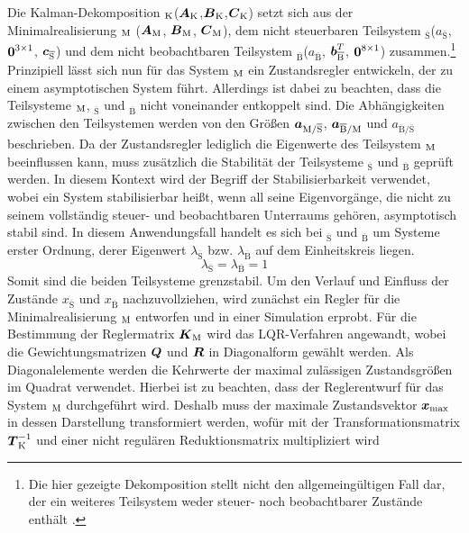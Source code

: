 Die Kalman-Dekomposition $_{\text{K}}$($\boldsymbol{A}_{\text{K}}$,$\boldsymbol{B}_{\text{K}}$,$\boldsymbol{C}_{\text{K}}$) setzt sich aus der Minimalrealisierung $_{\text{M}}$ ($\boldsymbol{A}_{\text{M}}$, $\boldsymbol{B}_{\text{M}}$, $\boldsymbol{C}_{\text{M}}$), dem nicht steuerbaren Teilsystem $_{\overline{\text{S}}}$($a_{\overline{\text{S}}}$, $\boldsymbol{0}^{3\times 1}$, $\boldsymbol{c}_{\overline{\text{S}}}$) und dem nicht beobachtbaren Teilsystem $_{\overline{\text{B}}}$($a_{\overline{\text{B}}}$, $\boldsymbol{b}^T_{\overline{\text{B}}}$, $\boldsymbol{0}^{8\times 1}$) zusammen.\footnote{Die hier gezeigte Dekomposition stellt nicht den allgemeingültigen Fall dar, der ein weiteres Teilsystem weder steuer- noch beobachtbarer Zustände enthält \cite[S. 108 ff.]{LunzeRT2}.} Prinzipiell lässt sich nun für das System $_{\text{M}}$ ein Zustandsregler entwickeln, der zu einem asymptotischen System führt. Allerdings ist dabei zu beachten, dass die Teilsysteme $_{\text{M}}$, $_{\overline{\text{S}}}$ und $_{\overline{\text{B}}}$ nicht voneinander entkoppelt sind. Die Abhängigkeiten zwischen den Teilsystemen werden von den Größen $\boldsymbol{a}_{\text{M}/\overline{\text{S}}}$, $\boldsymbol{a}_{\overline{\text{B}}/\text{M}}$ und $a_{\overline{\text{B}}/\overline{\text{S}}}$ beschrieben. Da der Zustandsregler lediglich die Eigenwerte des Teilsystem $_{\text{M}}$ beeinflussen kann, muss zusätzlich die Stabilität der Teilsysteme $_{\overline{\text{S}}}$ und $_{\overline{\text{B}}}$ geprüft werden. In diesem Kontext wird der Begriff der Stabilisierbarkeit verwendet, wobei ein System stabilisierbar heißt, wenn all seine Eigenvorgänge, die nicht zu seinem vollständig steuer- und beobachtbaren Unterraums gehören, asymptotisch stabil sind. In diesem Anwendungsfall handelt es sich bei $_{\overline{\text{S}}}$ und $_{\overline{\text{B}}}$ um Systeme erster Ordnung, derer Eigenwert $\lambda_{\overline{\text{S}}}$ bzw. $\lambda_{\overline{\text{B}}}$ auf dem Einheitskreis liegen.
\begin{equation}
\lambda_{\overline{\text{S}}} = \lambda_{\overline{\text{B}}} = 1
\end{equation}
Somit sind die beiden Teilsysteme grenzstabil. Um den Verlauf und Einfluss der Zustände $x_{\overline{\text{S}}}$ und $x_{\overline{\text{B}}}$ nachzuvollziehen, wird zunächst ein Regler für die Minimalrealisierung $_{\text{M}}$ entworfen und in einer Simulation erprobt. Für die Bestimmung der Reglermatrix $\boldsymbol{K}_{\text{M}}$ wird das LQR-Verfahren angewandt, wobei die Gewichtungsmatrizen $\boldsymbol{Q}$ und $\boldsymbol{R}$ in Diagonalform gewählt werden. Als Diagonalelemente werden die Kehrwerte der maximal zulässigen Zustandsgrößen im Quadrat verwendet. Hierbei ist zu beachten, dass der Reglerentwurf für das System $_{\text{M}}$ durchgeführt wird. Deshalb muss der maximale Zustandsvektor $\boldsymbol{x}_{\text{max}}$ in dessen Darstellung transformiert werden, wofür mit der Transformationsmatrix $\boldsymbol{T}^{-1}_{\text{K}}$ und einer nicht regulären Reduktionsmatrix multipliziert wird
